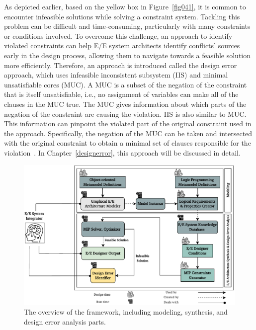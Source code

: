     As depicted earlier, based on the yellow box in Figure~\ref{fig041}, it is common to encounter infeasible solutions while solving a constraint system. Tackling this problem can be difficult and time-consuming, particularly with many constraints or conditions involved. To overcome this challenge, an approach to identify violated constraints can help E/E system architects identify conflicts' sources early in the design process, allowing them to navigate towards a feasible solution more efficiently. Therefore, an approach is introduced called the design error approach, which uses infeasible inconsistent subsystem (IIS) and minimal unsatisfiable cores (MUC). A MUC is a subset of the negation of the constraint that is itself unsatisfiable, i.e., no assignment of variables can make all of the clauses in the MUC true. The MUC gives information about which parts of the negation of the constraint are causing the violation. IIS is also similar to MUC. This information can pinpoint the violated part of the original constraint used in the approach. Specifically, the negation of the MUC can be taken and intersected with the original constraint to obtain a minimal set of clauses responsible for the violation~\cite{lynce2004computing, dershowitz2006scalable}. In Chapter~\ref{designerror}, this approach will be discussed in detail.
    \begin{figure}[t]
    	\centering
    	\includegraphics[width=1\textwidth]{figures/overview_tool.pdf}%
    	\caption{The overview of the framework, including modeling, synthesis, and design error analysis parts.}
    	\label{fig043}
    \end{figure}
